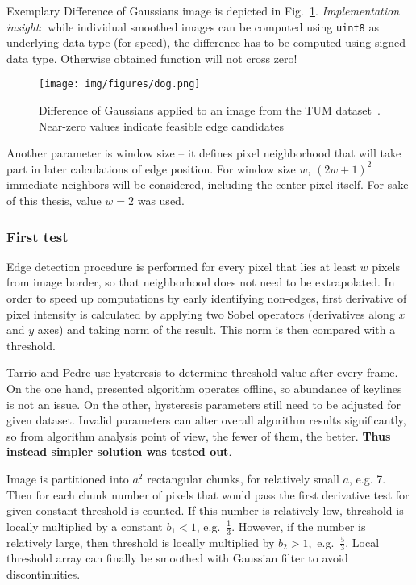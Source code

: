 Exemplary Difference of Gaussians image is depicted in Fig.~\ref{fig:dog}. \textit{Implementation insight}:~while individual smoothed images can be computed using {\tt uint8} as underlying data type (for speed), the difference has to be computed using signed data type. Otherwise obtained function will not cross zero!

\begin{figure}[ht]
	\centering\texttt{[image: img/figures/dog.png]}
	\caption{ Difference of Gaussians applied to an image from the TUM dataset~\cite{tum}. Near-zero values indicate feasible edge candidates }
	\label{fig:dog}
\end{figure}

Another parameter is window size -- it defines pixel neighborhood that will take part in later calculations of edge position. For window size $w$, $(2w+1)^2$ immediate neighbors will be considered, including the center pixel itself. For sake of this thesis, value $w = 2$ was used.

\subsubsection{First test}
\label{edge_first}

Edge detection procedure is performed for every pixel that lies at least $w$ pixels from image border, so that neighborhood does not need to be extrapolated. In order to speed up computations by early identifying non-edges, first derivative of pixel intensity is calculated by applying two Sobel operators (derivatives along $x$ and $y$ axes) and taking norm of the result. This norm is then compared with a threshold. 

Tarrio and Pedre use hysteresis to determine threshold value after every frame. On the one hand, presented algorithm operates offline, so abundance of keylines is not an issue. On the other, hysteresis parameters still need to be adjusted for given dataset. Invalid parameters can alter overall algorithm results significantly, so from algorithm analysis point of view, the fewer of them, the better. \textbf{Thus instead simpler solution was tested out}.

Image is partitioned into $a^2$ rectangular chunks, for relatively small $a$, e.g. 7. Then for each chunk number of pixels that would pass the first derivative test for given constant threshold is counted. If this number is relatively low, threshold is locally multiplied by a constant ${b_{1} < 1}$, e.g.~$\frac{1}{3}$. However, if the number is relatively large, then threshold is locally multiplied by ${b_{2} > 1}$,~e.g.~$\frac{5}{3}$. Local threshold array can finally be smoothed with Gaussian filter to avoid discontinuities.

